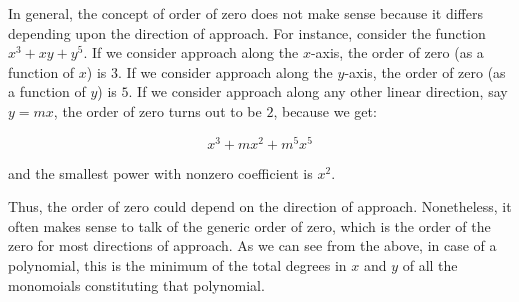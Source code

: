 \documentclass[10pt]{amsart}
\begin{document}
In general, the concept of order of zero does not make sense because
it differs depending upon the direction of approach. For instance,
consider the function $x^3 + xy + y^5$. If we consider approach along
the $x$-axis, the order of zero (as a function of $x$) is $3$. If we
consider approach along the $y$-axis, the order of zero (as a function
of $y$) is $5$. If we consider approach along any other linear
direction, say $y = mx$, the order of zero turns out to be $2$,
because we get:

$$x^3 + mx^2 + m^5x^5$$

and the smallest power with nonzero coefficient is $x^2$.

Thus, the order of zero could depend on the direction of
approach. Nonetheless, it often makes sense to talk of the generic
order of zero, which is the order of the zero for most directions of
approach. As we can see from the above, in case of a polynomial, this
is the minimum of the total degrees in $x$ and $y$ of all the
monomoials constituting that polynomial.
\end{document}
